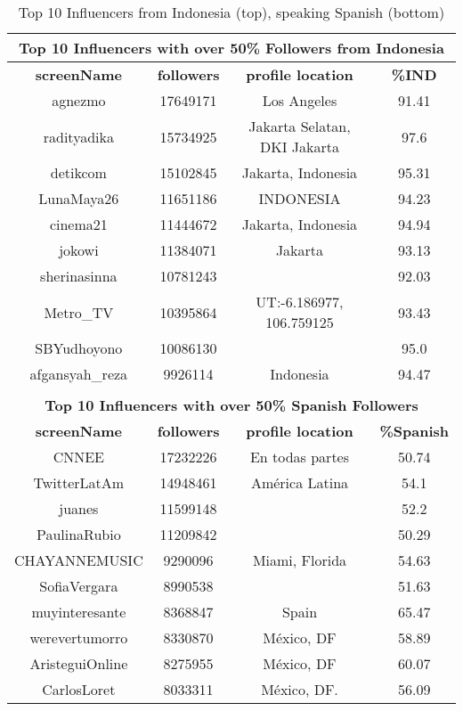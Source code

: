 \begin{table}
\small
\caption[Top Influencers of Indonesia (top), speaking Spanish (bottom)]{Top 10 Influencers from Indonesia (top), speaking Spanish (bottom)}
\label{table_10_app2}
\begin{center}
\begin{tabular}{|c|c|c|c|}
\multicolumn{4}{c}{\bfseries Top 10 Influencers with over 50\% Followers from Indonesia}\\
\hline
\bfseries screenName & \bfseries followers & \bfseries profile location & \bfseries {\%}IND\\
\hline
agnezmo & 17649171 & Los Angeles & 91.41 \\
\hline
radityadika & 15734925 & Jakarta Selatan, DKI Jakarta& 97.6 \\
\hline
detikcom & 15102845 & Jakarta, Indonesia & 95.31 \\
\hline
LunaMaya26 & 11651186 & INDONESIA & 94.23 \\
\hline
cinema21 & 11444672 & Jakarta, Indonesia & 94.94 \\
\hline
jokowi & 11384071 & Jakarta & 93.13 \\
\hline
sherinasinna & 10781243 &  & 92.03 \\
\hline
Metro{\_}TV & 10395864 & UT:-6.186977, 106.759125 & 93.43 \\
\hline
SBYudhoyono & 10086130 &  & 95.0 \\
\hline
afgansyah{\_}reza & 9926114 & Indonesia & 94.47 \\
\hline
\multicolumn{4}{c}{}\\
\multicolumn{4}{c}{\bfseries Top 10 Influencers with over 50\% Spanish Followers}\\
\hline
\bfseries screenName & \bfseries followers & \bfseries profile location & \bfseries {\%}Spanish\\
\hline
CNNEE & 17232226 & En todas partes & 50.74 \\
\hline
TwitterLatAm & 14948461 & América Latina & 54.1 \\
\hline
juanes & 11599148 &  & 52.2 \\
\hline
PaulinaRubio & 11209842 &  & 50.29 \\
\hline
CHAYANNEMUSIC & 9290096 & Miami, Florida & 54.63 \\
\hline
SofiaVergara & 8990538 &  & 51.63 \\
\hline
muyinteresante & 8368847 & Spain & 65.47 \\
\hline
werevertumorro & 8330870 & México, DF & 58.89 \\
\hline
AristeguiOnline & 8275955 & México, DF & 60.07 \\
\hline
CarlosLoret & 8033311 & México, DF. & 56.09 \\
\hline
\end{tabular}
\end{center}
\end{table}

